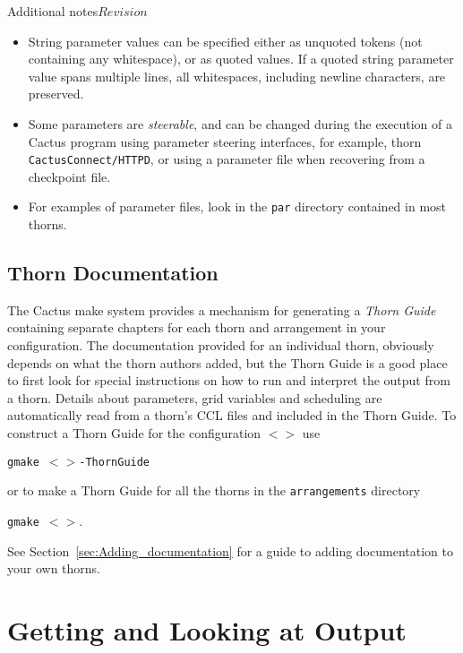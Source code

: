 \begin{cactuspart}{Additional notes}{}{$Revision$}
\begin{itemize}
\item{} String parameter values can be specified either as unquoted tokens (not
        containing any whitespace), or as quoted values. If a quoted string
        parameter value spans multiple lines, all whitespaces, including newline
        characters, are preserved.

\item{} Some parameters are \textit{steerable}, and can be changed during
        the execution of a Cactus program using parameter steering interfaces,
        for example, thorn \texttt{CactusConnect/HTTPD}, or using a
        parameter file when recovering from a checkpoint file.

\item{} For examples of parameter files, look in the \texttt{par} directory
        contained in most thorns.

\end{itemize}

\section{Thorn Documentation}
\label{sec:thdo}

The Cactus make system provides a mechanism for generating a
\textit{Thorn Guide} containing separate chapters for each thorn and
arrangement in your configuration. The documentation provided for an
individual thorn, obviously depends on what the thorn authors added,
but the Thorn Guide is a good place to first look for special
instructions on how to run and interpret the output from a thorn.
Details about parameters, grid variables and scheduling are
automatically read from a thorn's CCL files and included in the Thorn
Guide. To construct a Thorn Guide for the configuration
\texttt{$<$$>$} use

\texttt{gmake $<$$>$-ThornGuide}

or to make a Thorn Guide for all the thorns in the \texttt{arrangements} directory

\texttt{gmake $<$$>$}.

See Section~\ref{sec:Adding_documentation} for a guide to adding
documentation to your own thorns.




\chapter{Getting and Looking at Output}



\end{cactuspart}
